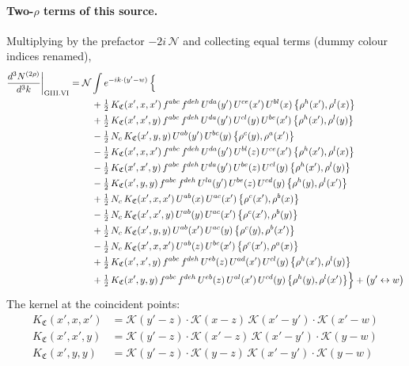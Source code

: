 \documentclass[10pt]{article}
\numberwithin{equation}{section}
\newcommand{\KK}{\mathcal K}
\newcommand{\NN}{\mathcal N}
\begin{document}
\paragraph{Two-$\rho$ terms of this source.} Multiplying by the prefactor $-2i\,\NN$ and collecting equal terms (dummy colour indices renamed),
\begin{align}
\frac{d^3N^{(2\rho)}}{d^3k}\bigg|_{\rm GIII.VI}={}&\NN\int e^{-ik\cdot(y'-w)}\,\Big\{\notag\\
&\quad +\tfrac12\,K_{\mathfrak C}(x',x,x')\,f^{abc}\,f^{deh}\,U^{da}(y')\,U^{ce}(x')\,U^{bl}(x)\,\big\{\rho^{h}(x'),\rho^{l}(x)\big\}\notag\\
&\quad +\tfrac12\,K_{\mathfrak C}(x',x',y)\,f^{abc}\,f^{deh}\,U^{da}(y')\,U^{cl}(y)\,U^{be}(x')\,\big\{\rho^{h}(x'),\rho^{l}(y)\big\}\notag\\
&\quad -\tfrac12\,N_{c}\,K_{\mathfrak C}(x',y,y)\,U^{ab}(y')\,U^{bc}(y)\,\big\{\rho^{c}(y),\rho^{a}(x')\big\}\notag\\
&\quad -\tfrac12\,K_{\mathfrak C}(x',x,x')\,f^{abc}\,f^{deh}\,U^{da}(y')\,U^{bl}(z)\,U^{ce}(x')\,\big\{\rho^{h}(x'),\rho^{l}(x)\big\}\notag\\
&\quad -\tfrac12\,K_{\mathfrak C}(x',x',y)\,f^{abc}\,f^{deh}\,U^{da}(y')\,U^{be}(z)\,U^{cl}(y)\,\big\{\rho^{h}(x'),\rho^{l}(y)\big\}\notag\\
&\quad -\tfrac12\,K_{\mathfrak C}(x',y,y)\,f^{abc}\,f^{deh}\,U^{la}(y')\,U^{be}(z)\,U^{cd}(y)\,\big\{\rho^{h}(y),\rho^{l}(x')\big\}\notag\\
&\quad +\tfrac12\,N_{c}\,K_{\mathfrak C}(x',x,x')\,U^{ab}(x)\,U^{ac}(x')\,\big\{\rho^{c}(x'),\rho^{b}(x)\big\}\notag\\
&\quad -\tfrac12\,N_{c}\,K_{\mathfrak C}(x',x',y)\,U^{ab}(y)\,U^{ac}(x')\,\big\{\rho^{c}(x'),\rho^{b}(y)\big\}\notag\\
&\quad +\tfrac12\,N_{c}\,K_{\mathfrak C}(x',y,y)\,U^{ab}(x')\,U^{ac}(y)\,\big\{\rho^{c}(y),\rho^{b}(x')\big\}\notag\\
&\quad -\tfrac12\,N_{c}\,K_{\mathfrak C}(x',x,x')\,U^{ab}(z)\,U^{bc}(x')\,\big\{\rho^{c}(x'),\rho^{a}(x)\big\}\notag\\
&\quad +\tfrac12\,K_{\mathfrak C}(x',x',y)\,f^{abc}\,f^{deh}\,U^{eb}(z)\,U^{ad}(x')\,U^{cl}(y)\,\big\{\rho^{h}(x'),\rho^{l}(y)\big\}\notag\\
&\quad +\tfrac12\,K_{\mathfrak C}(x',y,y)\,f^{abc}\,f^{deh}\,U^{eb}(z)\,U^{al}(x')\,U^{cd}(y)\,\big\{\rho^{h}(y),\rho^{l}(x')\big\}\Big\}+\big(y'\leftrightarrow w\big)\label{R:eq:res-GIII.VI}
\end{align}
The kernel at the coincident points:
\begin{align*}
K_{\mathfrak C}(x',x,x')&=\KK(y'-z)\cdot\KK(x-z)\,\KK(x'-y')\cdot\KK(x'-w)\\K_{\mathfrak C}(x',x',y)&=\KK(y'-z)\cdot\KK(x'-z)\,\KK(x'-y')\cdot\KK(y-w)\\K_{\mathfrak C}(x',y,y)&=\KK(y'-z)\cdot\KK(y-z)\,\KK(x'-y')\cdot\KK(y-w)
\end{align*}
\end{document}
